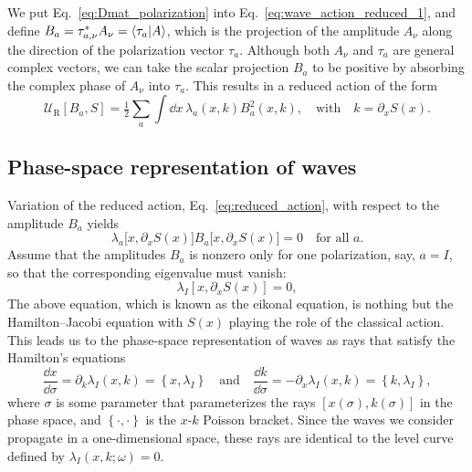 We put Eq.~\eqref{eq:Dmat_polarization} into Eq.~\eqref{eq:wave_action_reduced_1}, and define $B_{a} = \tau_{a, \nu}^{*}A_{\nu} = \mathinner{\langle{\tau_{a}|A}\rangle}$, which is the projection of the amplitude $A_{\nu}$ along the direction of the polarization vector $\tau_{a}$.
Although both $A_{\nu}$ and $\tau_{a}$ are general complex vectors, we can take the scalar projection $B_{a}$ to be positive by absorbing the complex phase of $A_{\nu}$ into $\tau_{a}$.
This results in a reduced action of the form
%
\begin{equation}
  \mathscr{U}_{\text{R}}\left[B_{a}, S\right] = \tfrac{1}{2} \sum_{a} \int \dd{x}\, \lambda_{a}(x,k) B_{a}^{2}(x, k),
  \quad\text{with}\quad
  k = \partial_{x}S(x).
  \label{eq:reduced_action}
\end{equation}

\subsection{Phase-space representation of waves}

Variation of the reduced action, Eq.~\eqref{eq:reduced_action}, with respect to the amplitude $B_{a}$ yields
%
\begin{equation}
  \lambda_{a}\big[x, \partial_{x}S(x)\big] B_{a}\big[x, \partial_{x}S(x)\big] = 0
  \quad\text{for all $a$}.
\end{equation}
%
Assume that the amplitudes $B_{a}$ is nonzero only for one polarization, say, $a = I$, so that the corresponding eigenvalue must vanish:
%
\begin{equation}
  \lambda_{I}\left[x, \partial_{x}S(x)\right] = 0,
  \label{eq:eikonal}
\end{equation}
%
The above equation, which is known as the eikonal equation, is nothing but the Hamilton--Jacobi equation with $S(x)$ playing the role of the classical action.
 This leads us to the phase-space representation of waves as rays that satisfy the Hamilton's equations
%
\begin{equation}
  \frac{\dd{x}}{\dd{\sigma}} = \partial_{k}\lambda_{I}(x, k) = \left\{x, \lambda_{I}\right\}
  \quad\text{and}\quad
  \frac{\dd{k}}{\dd{\sigma}} = -\partial_{x}\lambda_{I}(x, k) = \left\{k, \lambda_{I}\right\},
\end{equation}
%
where $\sigma$ is some parameter that parameterizes the rays $[x(\sigma), k(\sigma)]$ in the phase space, and $\left\{\cdot, \cdot\right\}$ is the $x$-$k$ Poisson bracket.
Since the waves we consider propagate in a one-dimensional space, these rays are identical to the level curve defined by $\lambda_{I}(x, k; \omega) = 0$.

